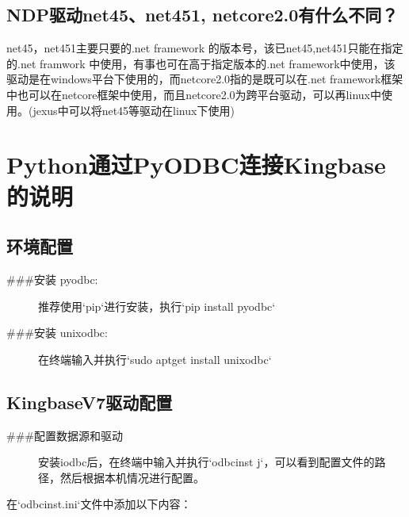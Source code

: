 \documentclass[a4,10pt,oneside,english]{sphinxmanual}
\begin{document}
\subsection{NDP驱动net45、net451, netcore2.0有什么不同？}
\label{\detokenize{interface/C_:ndpnet45net451-netcore2-0}}
net45，net451主要只要的.net framework 的版本号，该已net45,net451只能在指定的.net framwork 中使用，有事也可在高于指定版本的.net framework中使用，该驱动是在windows平台下使用的，而netcore2.0指的是既可以在.net framework框架中也可以在netcore框架中使用，而且netcore2.0为跨平台驱动，可以再linux中使用。(jexus中可以将net45等驱动在linux下使用)


\section{Python通过PyODBC连接Kingbase的说明}
\label{\detokenize{interface/python:pythonpyodbckingbase}}\label{\detokenize{interface/python::doc}}

\subsection{环境配置}
\label{\detokenize{interface/python:id1}}\begin{description}
\item[{\#\#\#安装 pyodbc:}] \leavevmode
推荐使用`pip`进行安装，执行`pip install pyodbc`

\item[{\#\#\#安装 unixodbc:}] \leavevmode
在终端输入并执行`sudo apt\sphinxhyphen{}get install unixodbc`

\end{description}


\subsection{KingbaseV7驱动配置}
\label{\detokenize{interface/python:kingbasev7}}\begin{description}
\item[{\#\#\#配置数据源和驱动}] \leavevmode
安装iodbc后，在终端中输入并执行`odbcinst \sphinxhyphen{}j`，可以看到配置文件的路径，然后根据本机情况进行配置。

\end{description}

在`odbcinst.ini`文件中添加以下内容：

\begin{sphinxVerbatim}[commandchars=\\\{\}]
\PYG{p}{[}\PYG{p}{]}
   
    
  
\end{sphinxVerbatim}
\end{document}
